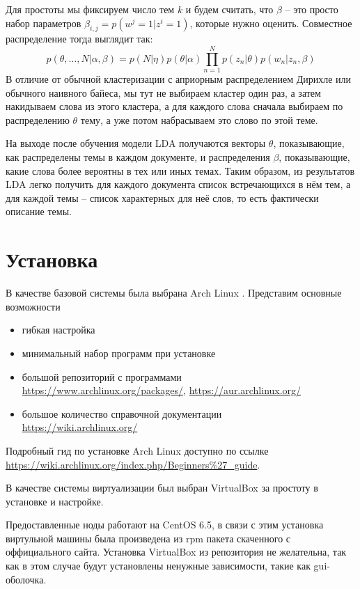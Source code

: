 Для простоты мы фиксируем число тем \( k \) и будем считать, что \( \beta \) -- это просто набор параметров \( \beta_{i,j} = p(w^j = 1 | z^i = 1)\), которые 
нужно оценить. Совместное распределение тогда выглядит так:
\[
    p(\theta,\ldots,N|\alpha,\beta) = 
        p(N|\eta)p(\theta|\alpha)\prod\limits_{n=1}^{N}p(z_n|\theta)p(w_n|z_n,\beta)
\]
В отличие от обычной кластеризации с априорным распределением Дирихле или обычного наивного байеса, мы тут не выбираем кластер один раз, а затем накидываем 
слова из этого кластера, а для каждого слова сначала выбираем по распределению \( \theta \) тему, а уже потом набрасываем это слово по этой теме.

На выходе после обучения модели LDA получаются векторы \( \theta \), показывающие, как распределены темы в каждом документе, и распределения \( \beta \), 
показывающие, какие слова более вероятны в тех или иных темах. Таким образом, из результатов LDA легко получить для каждого документа список встречающихся в 
нём тем, а для каждой темы -- список характерных для неё слов, то есть фактически описание темы.\cite{lda}

\section{Установка}
В качестве базовой системы была выбрана Arch Linux \cite{arch}. Представим основные возможности
\begin{itemize}
    \item гибкая настройка
    \item минимальный набор программ при установке
    \item большой репозиторий с программами \\
        \url{https://www.archlinux.org/packages/}, \url{https://aur.archlinux.org/}
    \item большое количество справочной документации\\
        \url{https://wiki.archlinux.org/}
\end{itemize}
Подробный гид по установке Arch Linux доступно по ссылке\\
\url{https://wiki.archlinux.org/index.php/Beginners%27_guide}.

В качестве системы виртуализации был выбран VirtualBox за простоту в установке и настройке. 

Предоставленные ноды работают на CentOS 6.5, в связи с этим установка виртульной машины была произведена из rpm пакета скаченного с оффициального сайта.
Установка VirtualBox из репозитория не желательна, так как в этом случае будут установлены ненужные зависимости, такие как gui-оболочка.

